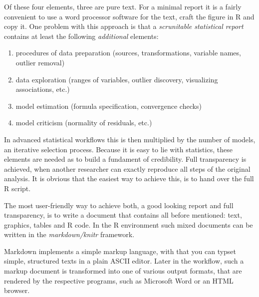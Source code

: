 \documentclass[]{svmono}
\providecommand{\tightlist}{%
  \setlength{\itemsep}{0pt}\setlength{\parskip}{0pt}}
\theoremstyle{definition}
\theoremstyle{definition}
\theoremstyle{definition}
\theoremstyle{remark}
\begin{document}
Of these four elements, three are pure text. For a minimal report it is
a fairly convenient to use a word processor software for the text, craft
the figure in R and copy it. One problem with this approach is that a
\emph{scrunitable statistical report} contains at least the following
\emph{additional} elements:

\begin{enumerate}
\def\labelenumi{\arabic{enumi}.}
\tightlist
\item
  procedures of data preparation (sources, transformations, variable
  names, outlier removal)
\item
  data exploration (ranges of variables, outlier discovery, visualizing
  associations, etc.)
\item
  model estimation (formula specification, convergence checks)
\item
  model criticism (normality of residuals, etc.)
\end{enumerate}

In advanced statistical workflows this is then multiplied by the number
of models, an iterative selection process. Because it is easy to lie
with statistics, these elements are needed as to build a fundament of
credibility. Full transparency is achieved, when another researcher can
exactly reproduce all steps of the original analysis. It is obvious that
the easiest way to achieve this, is to hand over the full R script.

The most user-friendly way to achieve both, a good looking report and
full transparency, is to write a document that contains all before
mentioned: text, graphics, tables and R code. In the R environment such
mixed documents can be written in the \emph{markdown/knitr} framework.

Markdown implements a simple markup language, with that you can typset
simple, structured texts in a plain ASCII editor. Later in the workflow,
such a markup document is transformed into one of various output
formats, that are rendered by the respective programs, such as Microsoft
Word or an HTML browser.
\end{document}
